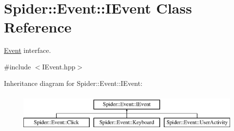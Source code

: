 \hypertarget{class_spider_1_1_event_1_1_i_event}{}\section{Spider\+:\+:Event\+:\+:I\+Event Class Reference}
\label{class_spider_1_1_event_1_1_i_event}


\hyperlink{namespace_spider_1_1_event}{Event} interface.  




{\ttfamily \#include $<$I\+Event.\+hpp$>$}

Inheritance diagram for Spider\+:\+:Event\+:\+:I\+Event\+:\begin{figure}[H]
\begin{center}
\leavevmode
\includegraphics[height=2.000000cm]{class_spider_1_1_event_1_1_i_event}
\end{center}
\end{figure}
